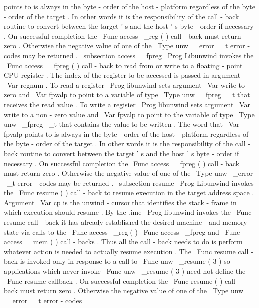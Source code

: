 points
to
is
always
in
the
byte
-
order
of
the
host
-
platform
regardless
of
the
byte
-
order
of
the
target
.
In
other
words
it
is
the
responsibility
of
the
call
-
back
routine
to
convert
between
the
target
'
s
and
the
host
'
s
byte
-
order
if
necessary
.
On
successful
completion
the
\
Func
{
access
\
_reg
}
(
)
call
-
back
must
return
zero
.
Otherwise
the
negative
value
of
one
of
the
\
Type
{
unw
\
_error
\
_t
}
error
-
codes
may
be
returned
.
\
subsection
{
access
\
_fpreg
}
\
Prog
{
Libunwind
}
invokes
the
\
Func
{
access
\
_fpreg
}
(
)
call
-
back
to
read
from
or
write
to
a
floating
-
point
CPU
register
.
The
index
of
the
register
to
be
accessed
is
passed
in
argument
\
Var
{
regnum
}
.
To
read
a
register
\
Prog
{
libunwind
}
sets
argument
\
Var
{
write
}
to
zero
and
\
Var
{
fpvalp
}
to
point
to
a
variable
of
type
\
Type
{
unw
\
_fpreg
\
_t
}
that
receives
the
read
value
.
To
write
a
register
\
Prog
{
libunwind
}
sets
argument
\
Var
{
write
}
to
a
non
-
zero
value
and
\
Var
{
fpvalp
}
to
point
to
the
variable
of
type
\
Type
{
unw
\
_fpreg
\
_t
}
that
contains
the
value
to
be
written
.
The
word
that
\
Var
{
fpvalp
}
points
to
is
always
in
the
byte
-
order
of
the
host
-
platform
regardless
of
the
byte
-
order
of
the
target
.
In
other
words
it
is
the
responsibility
of
the
call
-
back
routine
to
convert
between
the
target
'
s
and
the
host
'
s
byte
-
order
if
necessary
.
On
successful
completion
the
\
Func
{
access
\
_fpreg
}
(
)
call
-
back
must
return
zero
.
Otherwise
the
negative
value
of
one
of
the
\
Type
{
unw
\
_error
\
_t
}
error
-
codes
may
be
returned
.
\
subsection
{
resume
}
\
Prog
{
Libunwind
}
invokes
the
\
Func
{
resume
}
(
)
call
-
back
to
resume
execution
in
the
target
address
space
.
Argument
\
Var
{
cp
}
is
the
unwind
-
cursor
that
identifies
the
stack
-
frame
in
which
execution
should
resume
.
By
the
time
\
Prog
{
libunwind
}
invokes
the
\
Func
{
resume
}
call
-
back
it
has
already
established
the
desired
machine
-
and
memory
-
state
via
calls
to
the
\
Func
{
access
\
_reg
}
(
)
\
Func
{
access
\
_fpreg
}
and
\
Func
{
access
\
_mem
}
(
)
call
-
backs
.
Thus
all
the
call
-
back
needs
to
do
is
perform
whatever
action
is
needed
to
actually
resume
execution
.
The
\
Func
{
resume
}
call
-
back
is
invoked
only
in
response
to
a
call
to
\
Func
{
unw
\
_resume
}
(
3
)
so
applications
which
never
invoke
\
Func
{
unw
\
_resume
}
(
3
)
need
not
define
the
\
Func
{
resume
}
callback
.
On
successful
completion
the
\
Func
{
resume
}
(
)
call
-
back
must
return
zero
.
Otherwise
the
negative
value
of
one
of
the
\
Type
{
unw
\
_error
\
_t
}
error
-
codes
